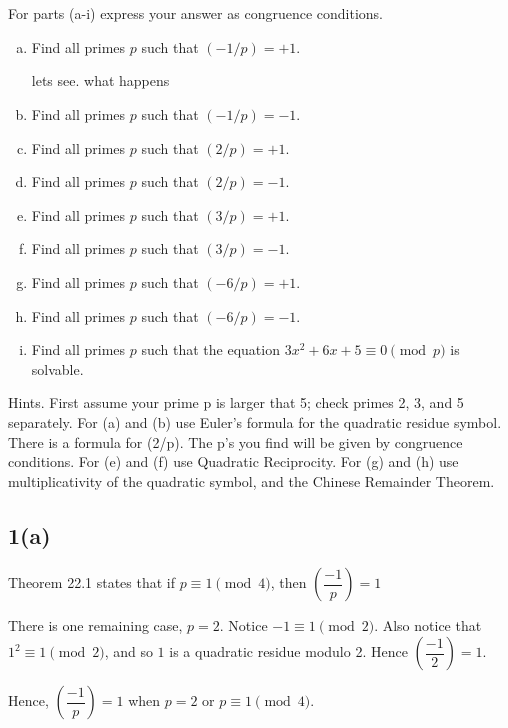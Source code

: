 \section{}

For parts (a-i) express your answer as congruence conditions.
\begin{enumerate}[(a)]
\item Find all primes $p$ such that $(-1/p) = +1$. 

lets see. what happens
\item Find all primes $p$ such that $(-1/p) = -1$. 
\item Find all primes $p$ such that $(2/p) = +1$.
\item Find all primes $p$ such that $(2/p) = -1$.
\item Find all primes $p$ such that $(3/p) = +1$.
\item Find all primes $p$ such that $(3/p) = -1$.
\item Find all primes $p$ such that $(-6/p) = +1$. 
\item Find all primes $p$ such that $(-6/p) = -1$. 
\item Find all primes $p$ such that the equation
$3x^2 + 6x + 5 \equiv 0 \pmod{p}$ is solvable.
\end{enumerate}

Hints.  First assume your prime p is larger that 5; check primes 2, 3, and 5 
separately.  For (a) and (b) use Euler's formula for the quadratic residue 
symbol. There is a formula for (2/p). The p's you find will be given by
congruence conditions. For (e) and (f) use Quadratic Reciprocity. For (g) and 
(h) use multiplicativity of the quadratic symbol, and the Chinese Remainder 
Theorem.


\subsection{1(a)}
Theorem 22.1 states that if $p \equiv 1 \pmod 4$, then
$\left( \dfrac{-1}{p} \right)  = 1$ 

There is one remaining case, $p=2$. Notice $-1 \equiv 1 \pmod 2$. Also notice
that $1^2 \equiv 1 \pmod 2$, and so $1$ is a quadratic residue modulo 2. Hence
$\left( \dfrac{-1}{2} \right) = 1$.

Hence, $\left( \dfrac{-1}{p} \right)  = 1$ when $p = 2$ or $p \equiv 1 \pmod 4$.

